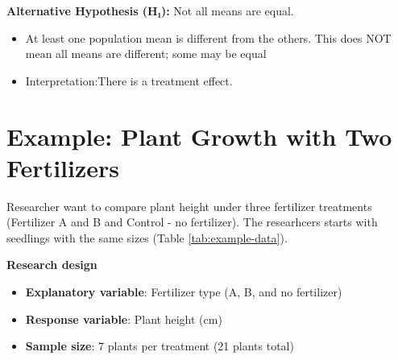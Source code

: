 \documentclass[
]{book}
\providecommand{\tightlist}{%
  \setlength{\itemsep}{0pt}\setlength{\parskip}{0pt}}
\begin{document}
\textbf{Alternative Hypothesis (H₁):} Not all means are equal.

\begin{itemize}
\tightlist
\item
  At least one population mean is different from the others. This does NOT mean all means are different; some may be equal
\item
  Interpretation:There is a treatment effect.
\end{itemize}

\section{Example: Plant Growth with Two Fertilizers}\label{example-plant-growth-with-two-fertilizers}

Researcher want to compare plant height under three fertilizer treatments (Fertilizer A and B and Control - no fertilizer). The researhcers starts with seedlings with the same sizes (Table \ref{tab:example-data}).

\textbf{Research design}

\begin{itemize}
\tightlist
\item
  \textbf{Explanatory variable}: Fertilizer type (A, B, and no fertilizer)
\item
  \textbf{Response variable}: Plant height (cm)
\item
  \textbf{Sample size}: 7 plants per treatment (21 plants total)
\end{itemize}
\end{document}

